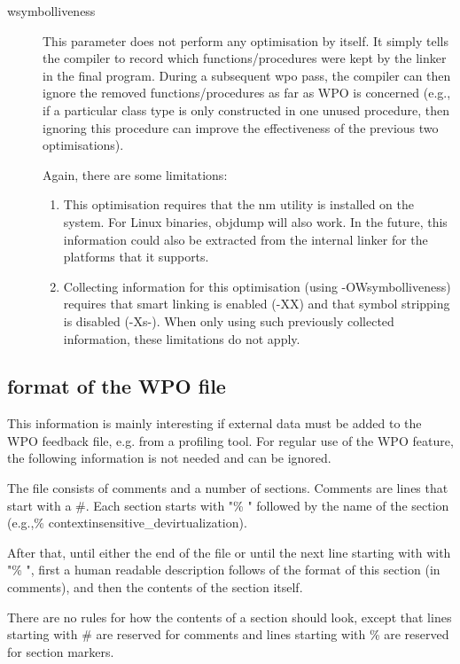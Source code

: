 \begin{description}
\item[wsymbolliveness]
This parameter does not perform any optimisation by itself. It simply tells
the compiler to record which functions/procedures were kept by the linker in
the final program. During a subsequent wpo pass, the compiler can then
ignore the removed functions/procedures as far as WPO is concerned (e.g., if
a particular class type is only constructed in one unused procedure, then
ignoring this procedure can improve the effectiveness of the previous two
optimisations). 

Again, there are some limitations:
\begin{enumerate}
\item This optimisation requires that the nm utility is installed on the system.
For Linux binaries, objdump will also work. In the future, this information
could also be extracted from the internal linker for the platforms that it
supports. 
\item Collecting information for this optimisation (using -OWsymbolliveness)
requires that smart linking is enabled (-XX) and that symbol stripping is
disabled (-Xs-). When only using such previously collected information,
these limitations do not apply.
\end{enumerate}
\end{description}

\subsection{format of the WPO file}
This information is mainly interesting if external data must be added to
the WPO feedback file, e.g. from a profiling tool. For regular use of the
WPO feature, the following information is not needed and can be ignored.

The file consists of comments and a number of sections. Comments are lines
that start with a \#. Each section starts with "\% " followed by the name of
the section (e.g.,\% contextinsensitive\_devirtualization). 

After that, until either the end of the file or until the next line starting 
with with "\% ", first a human readable description follows of the format of 
this section (in comments), and then the contents of the section itself. 

There are no rules for how the contents of a section should look, except
that lines starting with \# are reserved for comments and lines starting with
\%  are reserved for section markers. 



